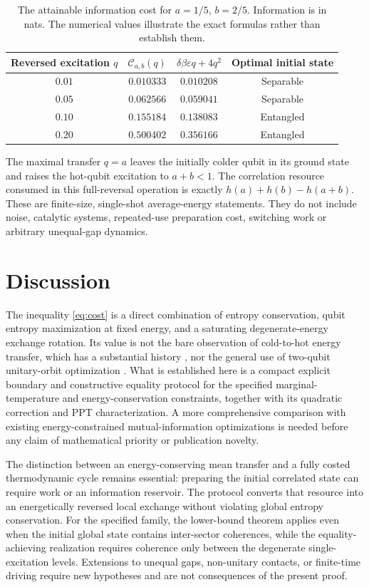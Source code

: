 \documentclass[11pt,a4paper]{article}
\newcommand{\eps}{\varepsilon}
\begin{document}
\begin{table}[h]
\centering
\caption{The attainable information cost for $a=1/5$, $b=2/5$. Information is in nats. The numerical values illustrate the exact formulas rather than establish them.}
\begin{tabular}{@{}cccc@{}}
\toprule
Reversed excitation $q$ & $\mathcal C_{a,b}(q)$ & $\delta\beta\eps q+4q^2$ & Optimal initial state\\
\midrule
$0.01$&$0.010333$&$0.010208$&Separable\\
$0.05$&$0.062566$&$0.059041$&Separable\\
$0.10$&$0.155184$&$0.138083$&Entangled\\
$0.20$&$0.500402$&$0.356166$&Entangled\\
\bottomrule
\end{tabular}
\label{tab:cost}
\end{table}

The maximal transfer $q=a$ leaves the initially colder qubit in its ground state and raises the hot-qubit excitation to $a+b<1$. The correlation resource consumed in this full-reversal operation is exactly $h(a)+h(b)-h(a+b)$. These are finite-size, single-shot average-energy statements. They do not include noise, catalytic systems, repeated-use preparation cost, switching work or arbitrary unequal-gap dynamics.

\section{Discussion}
The inequality \eqref{eq:cost} is a direct combination of entropy conservation, qubit entropy maximization at fixed energy, and a saturating degenerate-energy exchange rotation. Its value is not the bare observation of cold-to-hot energy transfer, which has a substantial history \cite{partovi,jennings,micadei}, nor the general use of two-qubit unitary-orbit optimization \cite{jevticprl,jevticpra}. What is established here is a compact explicit boundary and constructive equality protocol for the specified marginal-temperature and energy-conservation constraints, together with its quadratic correction and PPT characterization. A more comprehensive comparison with existing energy-constrained mutual-information optimizations is needed before any claim of mathematical priority or publication novelty.

The distinction between an energy-conserving mean transfer and a fully costed thermodynamic cycle remains essential: preparing the initial correlated state can require work or an information reservoir. The protocol converts that resource into an energetically reversed local exchange without violating global entropy conservation. For the specified family, the lower-bound theorem applies even when the initial global state contains inter-sector coherences, while the equality-achieving realization requires coherence only between the degenerate single-excitation levels. Extensions to unequal gaps, non-unitary contacts, or finite-time driving require new hypotheses and are not consequences of the present proof.
\end{document}
